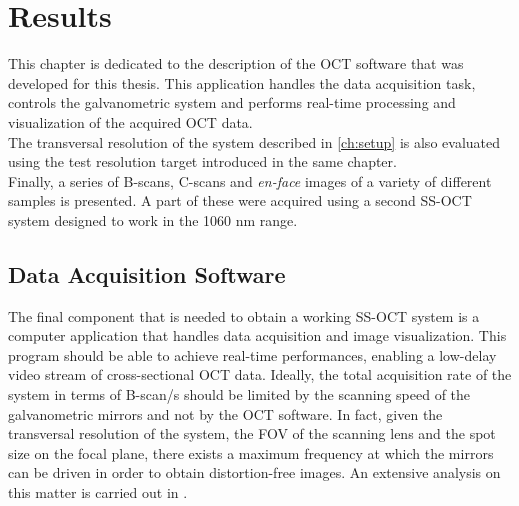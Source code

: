
\chapter{Results} %
\label{ch:results} %

This chapter is dedicated to the description of the OCT software that was developed for this thesis. This application handles the data acquisition task, controls the galvanometric system and performs real-time processing and visualization of the acquired OCT data. \\

\noindent The transversal resolution of the system described in \autoref{ch:setup} is also evaluated using the test resolution target introduced in the same chapter. \\

\noindent Finally, a series of B-scans, C-scans and \emph{en-face} images of a variety of different samples is presented. A part of these were acquired using a second SS-OCT system designed to work in the 1060 nm range. 



\section{Data Acquisition Software}

The final component that is needed to obtain a working SS-OCT system is a computer application that handles data acquisition and image visualization. This program should be able to achieve real-time performances, enabling a low-delay video stream of cross-sectional OCT data. Ideally, the total acquisition rate of the system in terms of B-scan/s should be limited by the scanning speed of the galvanometric mirrors and not by the OCT software. In fact, given the transversal resolution of the system, the FOV of the scanning lens and the spot size on the focal plane, there exists a maximum frequency at which the mirrors can be driven in order to obtain distortion-free images. An extensive analysis on this matter is carried out in \cite{Calabrese2017}. \\



